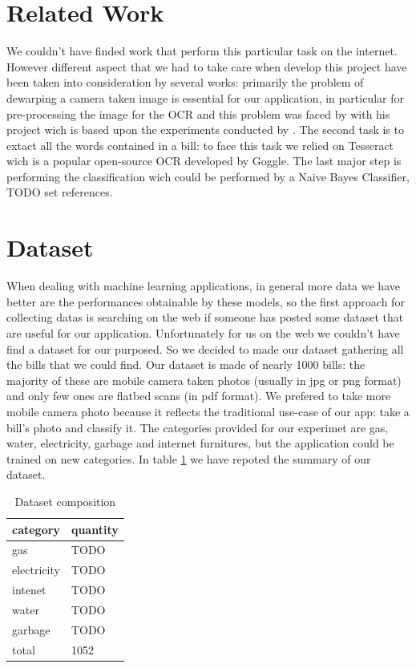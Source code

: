 \documentclass[10pt,twocolumn,letterpaper]{article}
\begin{document}
\section{Related Work}
We couldn't have finded work that perform this particular task on the internet. However different aspect that we had to take care when develop this project have been taken into consideration by several works: primarily the problem of dewarping a camera taken image is essential for our application, in particular for pre-processing the image for the OCR and this problem was faced by \cite{Improvingcamera-based} with his project \cite{mobile-ocr} wich is based upon the experiments conducted by \cite{recoveringhomography}. The second task is to extact all the words contained in a bill: to face this task we relied on Tesseract \cite{Tesseract} wich is a popular open-source OCR developed by Goggle. The last major step is performing the classification wich could be performed by a Naive Bayes Classifier, TODO set references. 

\section{Dataset}
When dealing with machine learning applications, in general more data we have  better are the performances obtainable by these models, so the first approach for collecting datas is searching on the web if someone has posted some dataset that are useful for our application. Unfortunately for us on the web we couldn't have find a dataset for our purposed. So we decided to made our  dataset gathering all the bills that we could find. Our dataset is made of nearly 1000 bills: the majority of these are mobile camera taken photos (usually in jpg or png format) and only few ones are flatbed scans (in pdf format). We prefered to take more mobile camera photo because it reflects the traditional use-case of our app: take a bill's photo and classify it. The categories provided for our experimet are gas, water, electricity, garbage and internet furnitures, but the application could be trained on new categories. In table \ref{dataset-table} we have repoted the summary of our dataset.


\begin{table}[!h]
	\begin{center}
		\begin{tabular}{ll}
			\hline
			category    & quantity \\ \hline
			gas         & TODO     \\
			electricity & TODO     \\
			intenet     & TODO     \\
			water       & TODO     \\
			garbage     & TODO     \\ \hline
			total       & 1052     \\ \hline
		\end{tabular}
	\end{center}
	\label{dataset-table}
	\caption{Dataset composition}
\end{table}
\end{document}
